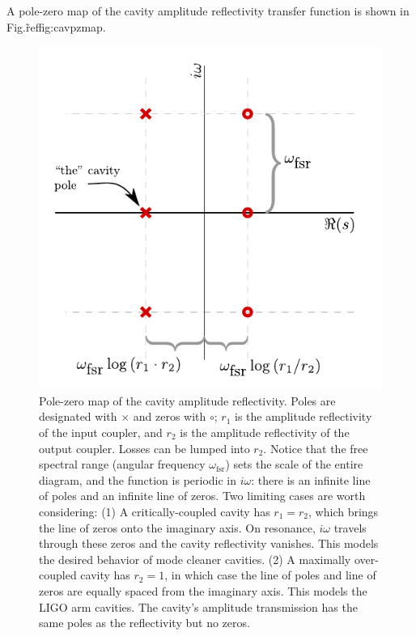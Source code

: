 \label{chapter7}
\onehalfspace
{}
A pole-zero map of the cavity amplitude reflectivity transfer function is shown in Fig.\~ref{fig:cavpzmap}.

\begin{figure}[b]
\includegraphics{figures/cavitypzmap.pdf}
\caption{\label{fig:cavpzmap} Pole-zero map of the cavity amplitude
  reflectivity.
  Poles are designated with $\times$ and zeros with
  $\circ$; $r_1$ is the amplitude reflectivity of the input coupler,
  and $r_2$ is the amplitude reflectivity of the output coupler.
  Losses can be lumped into $r_2$.  Notice that the free spectral
  range (angular frequency $\omega_{\textrm{fsr}}$) sets the scale of
  the entire diagram, and the function is periodic in $i\omega$: there
  is an infinite line of poles and an infinite line of zeros.  Two
  limiting cases are worth considering: (1) A critically-coupled
  cavity has $r_1=r_2$, which brings the line of zeros onto the
  imaginary axis. On resonance, $i\omega$ travels through these zeros
  and the cavity reflectivity vanishes.  This models the desired
  behavior of mode cleaner cavities. (2) A maximally over-coupled
  cavity has $r_2=1$, in which case the line of poles and line of
  zeros are equally spaced from the imaginary axis.  This models the
  LIGO arm cavities.  
  The cavity's amplitude transmission has the same poles as the
  reflectivity but no zeros.
}
\end{figure}

